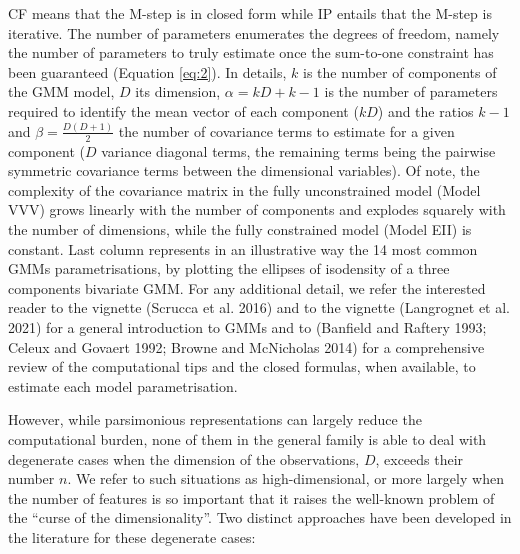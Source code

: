 CF means that the M-step is in closed form while IP entails that the M-step is iterative. The number of parameters enumerates the degrees of freedom, namely the number of parameters to truly estimate once the sum-to-one constraint has been guaranteed (Equation \eqref{eq:2}). In details, \(k\) is the number of components of the GMM model, \(D\) its dimension, \(\alpha=kD + k - 1\) is the number of parameters required to identify the mean vector of each component (\(kD\)) and the ratios \(k-1\) and \(\beta=\frac{D(D+1)}{2}\) the number of covariance terms to estimate for a given component (\(D\) variance diagonal terms, the remaining terms being the pairwise symmetric covariance terms between the dimensional variables). Of note, the complexity of the covariance matrix in the fully unconstrained model (Model VVV) grows linearly with the number of components and explodes squarely with the number of dimensions, while the fully constrained model (Model EII) is constant. Last column represents in an illustrative way the 14 most common GMMs parametrisations, by plotting the ellipses of isodensity of a three components bivariate GMM. For any additional detail, we refer the interested reader to the  vignette (Scrucca et al. 2016) and to the  vignette (Langrognet et al. 2021) for a general introduction to GMMs and to (Banfield and Raftery 1993; Celeux and Govaert 1992; Browne and McNicholas 2014) for a comprehensive review of the computational tips and the closed formulas, when available, to estimate each model parametrisation.

However, while parsimonious representations can largely reduce the computational burden, none of them in the general family is able to deal with degenerate cases when the dimension of the observations, \(D\), exceeds their number \(n\). We refer to such situations as high-dimensional, or more largely when the number of features is so important that it raises the well-known problem of the ``curse of the dimensionality''. Two distinct approaches have been developed in the literature for these degenerate cases:

